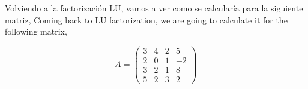

 

\begin{paracol}{2}
Volviendo a la factorización LU, vamos a ver como se calcularía para la siguiente matriz,	
\switchcolumn
Coming back to LU factorization, we are going to calculate it for the following matrix,
\end{paracol}
\begin{equation*}
A=\begin{pmatrix}
3& 4& 2&5\\
2& 0& 1& -2\\
3& 2& 1& 8\\
5& 2& 3& 2
\end{pmatrix} 
\end{equation*}

